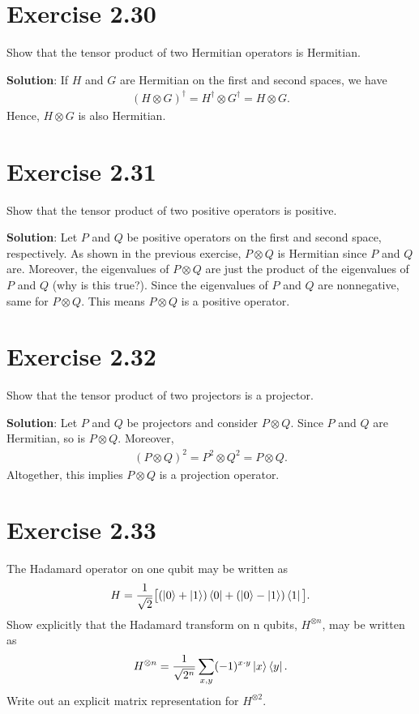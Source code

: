 \documentclass{book}
\begin{document}
\section*{Exercise 2.30}
    Show that the tensor product of two Hermitian operators is Hermitian.
    
    \textbf{Solution}: If $H$ and $G$ are Hermitian on the first and second spaces, we have
    \begin{align}
        (H\otimes G)^\dagger = H^\dagger \otimes G^\dagger = H \otimes G.
    \end{align}
    Hence, $H\otimes G$ is also Hermitian.

\section*{Exercise 2.31}
    Show that the tensor product of two positive operators is positive.
    
    \textbf{Solution}: Let $P$ and $Q$ be positive operators on the first and second space, respectively. As shown in the previous exercise, $P\otimes Q$ is Hermitian since $P$ and $Q$ are. Moreover, the eigenvalues of $P\otimes Q$ are just the product of the eigenvalues of $P$ and $Q$ (why is this true?). Since the eigenvalues of $P$ and $Q$ are nonnegative, same for $P\otimes Q$. This means $P \otimes Q$ is a positive operator. 
    
\section*{Exercise 2.32}
    Show that the tensor product of two projectors is a projector.
    
    \textbf{Solution}: Let $P$ and $Q$ be projectors and consider $P\otimes Q$. Since $P$ and $Q$ are Hermitian, so is $P\otimes Q$. Moreover,
    \begin{align}
        (P \otimes Q)^2 = P^2 \otimes Q^2 = P \otimes Q.
    \end{align}
    Altogether, this implies $P\otimes Q$ is a projection operator.
    
\section*{Exercise 2.33}
    The Hadamard operator on one qubit may be written as
    \begin{align}
        H = \frac{1}{\sqrt{2}}\big[(\ket{0}+\ket{1})\bra{0}+ (\ket{0}-\ket{1})\bra{1}\big].
    \end{align}
    Show explicitly that the Hadamard transform on n qubits, $H^{\otimes n}$, may be written as
    \begin{align}
        H^{\otimes n} = \frac{1}{\sqrt{2^n}} \sum_{x,y} (-1)^{x\cdot y} \ket{x}\bra{y}.
    \end{align}
    Write out an explicit matrix representation for $H^{\otimes 2}$.
    
\end{document}
